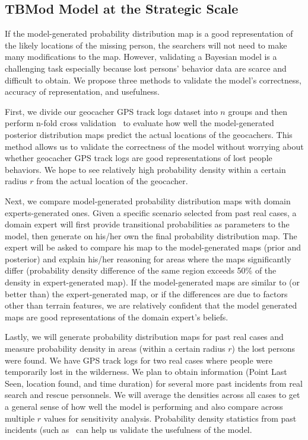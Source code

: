 \subsection{\textbf{TBMod} Model at the Strategic Scale}

If the model-generated probability distribution map is a good representation of the likely locations of the missing person, the searchers will not need to make many modifications to the map. However, validating a Bayesian model is a challenging task especially because lost persons' behavior data are scarce and difficult to obtain. We propose three methods to validate the model's correctness, accuracy of representation, and usefulness.

First, we divide our geocacher GPS track logs dataset into $n$ groups and then perform n-fold cross validation~\cite{Mitchell1997Machine} to evaluate how well the model-generated posterior distribution maps predict the actual locations of the geocachers. This method allows us to validate the correctness of the model without worrying about whether geocacher GPS track logs are good representations of lost people behaviors. We hope to see relatively high probability density within a certain radius $r$ from the actual location of the geocacher.

Next, we compare model-generated probability distribution maps with domain experts-generated ones. Given a specific scenario selected from past real cases, a domain expert will first provide transitional probabilities as parameters to the model, then generate on his/her own the final probability distribution map. The expert will be asked to compare his map to the model-generated maps (prior and posterior) and explain his/her reasoning for areas where the maps significantly differ (probability density difference of the same region exceeds 50\% of the density in expert-generated map). If the model-generated maps are similar to (or better than) the expert-generated map, or if the differences are due to factors other than terrain features, we are relatively confident that the model generated maps are good representations of the domain expert's beliefs.

Lastly, we will generate probability distribution maps for past real cases and measure probability density in areas (within a certain radius $r$) the lost persons were found. We have GPS track logs for two real cases where people were temporarily lost in the wilderness. We plan to obtain information (Point Last Seen, location found, and time duration) for several more past incidents from real search and rescue personnels. We will average the densities across all cases to get a general sense of how well the model is performing and also compare across multiple $r$ values for sensitivity analysis. Probability density statistics from past incidents (such as~\cite{Koester2008Lost} can help us validate the usefulness of the model.

